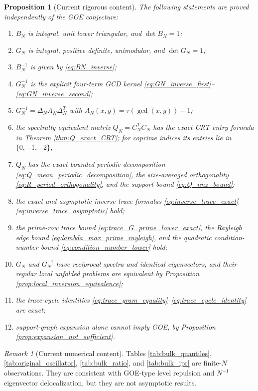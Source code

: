 \documentclass[11pt]{amsart}
\numberwithin{equation}{section}
\theoremstyle{plain}
\newtheorem{proposition}[theorem]{Proposition}
\theoremstyle{definition}
\theoremstyle{remark}
\newtheorem{remark}[theorem]{Remark}
\begin{document}
\begin{proposition}[Current rigorous content]
\label{prop:current_rigorous_content}
The following statements are proved independently of the GOE conjecture:
\begin{enumerate}[label=(\roman*)]
\item $B_N$ is integral, unit lower triangular, and $\det B_N=1$;
\item $G_N$ is integral, positive definite, unimodular, and $\det G_N=1$;
\item $B_N^{-1}$ is given by \eqref{eq:BN_inverse};
\item $G_N^{-1}$ is the explicit four-term GCD kernel \eqref{eq:GN_inverse_first}--\eqref{eq:GN_inverse_second};
\item $G_N^{-1}=\Delta_NA_N\Delta_N^T$ with $A_N(x,y)=\tau(\gcd(x,y))-1$;
\item the spectrally equivalent matrix $Q_N=C_N^TC_N$ has the exact CRT entry formula in Theorem \ref{thm:Q_exact_CRT}; for coprime indices its entries lie in $\{0,-1,-2\}$;
\item $Q_N$ has the exact bounded periodic decomposition \eqref{eq:Q_mean_periodic_decomposition}, the size-averaged orthogonality \eqref{eq:R_period_orthogonality}, and the support bound \eqref{eq:Q_nnz_bound};
\item the exact and asymptotic inverse-trace formulas \eqref{eq:inverse_trace_exact}--\eqref{eq:inverse_trace_asymptotic} hold;
\item the prime-row trace bound \eqref{eq:trace_G_prime_lower_exact}, the Rayleigh edge bound \eqref{eq:lambda_max_prime_rayleigh}, and the quadratic condition-number bound \eqref{eq:condition_number_lower} hold;
\item $G_N$ and $G_N^{-1}$ have reciprocal spectra and identical eigenvectors, and their regular local unfolded problems are equivalent by Proposition \ref{prop:local_inversion_equivalence};
\item the trace-cycle identities \eqref{eq:trace_gram_equality}--\eqref{eq:trace_cycle_identity} are exact;
\item support-graph expansion alone cannot imply GOE, by Proposition \ref{prop:expansion_not_sufficient}.
\end{enumerate}
\end{proposition}

\begin{remark}[Current numerical content]
\label{rem:current_numerical_content}
Tables \ref{tab:bulk_quantiles}, \ref{tab:original_oscillator}, \ref{tab:bulk_ratio}, and \ref{tab:bulk_ipr} are finite-$N$ observations.  They are consistent with GOE-type level repulsion and $N^{-1}$ eigenvector delocalization, but they are not asymptotic results.
\end{remark}
\end{document}
